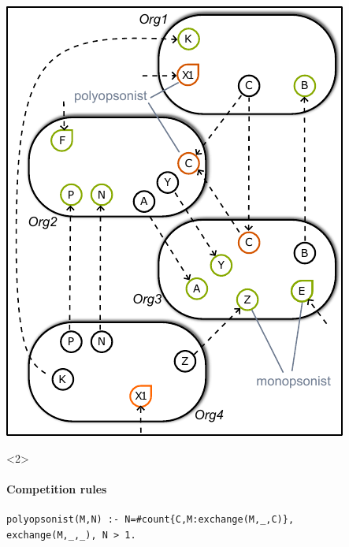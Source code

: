 \documentclass[8pt]{beamer}
\begin{document}
\begin{frame}[fragile]
\begin{onlyenv}
\begin{minipage}{0.45\textwidth}
\includegraphics[width=\textwidth]{figures/poly-monoopsonie.pdf}
\end{minipage}

\end{onlyenv}

\begin{onlyenv}<2>
\framesubtitle{Competition rules}
\begin{minipage}{0.5\textwidth}
\begin{lstlisting}[mathescape=True,label={lst:competition}, captionpos=b]
% cas pour les metabolites echangeables
polyopsonist(M,N) :- N=#count{C,M:exchange(M,_,C)},
exchange(M,_,_), N > 1.
		 	

\end{lstlisting}
\end{minipage}
\end{onlyenv}
\end{frame}
\end{document}
